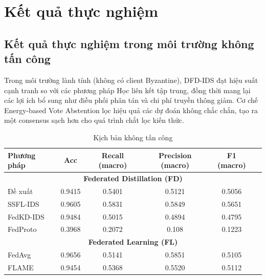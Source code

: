 \section{Kết quả thực nghiệm}
\label{sec:results}

\newcommand{\topone}[1]{\cellcolor{green!90!black}#1}
\newcommand{\toptwo}[1]{\cellcolor{green!60!black}#1}
\newcommand{\topthree}[1]{\cellcolor{green!30}#1}

\subsection{Kết quả thực nghiệm trong môi trường không tấn công}
Trong môi trường lành tính (không có client Byzantine), DFD-IDS đạt hiệu suất cạnh tranh so với các phương pháp Học liên kết tập trung, đồng thời mang lại các lợi ích bổ sung như điều phối phân tán và chi phí truyền thông giảm. Cơ chế Energy-based Vote Abstention lọc hiệu quả các dự đoán không chắc chắn, tạo ra một consensus sạch hơn cho quá trình chắt lọc kiến thức.

\begin{table}[H]
\centering
\small
\caption{Kịch bản không tấn công}
\label{tab:benign}
\begin{tabularx}{\textwidth}{lccccX}
\toprule
\textbf{Phương pháp} & \textbf{Acc} & \textbf{Recall (macro)} & \textbf{Precision (macro)} & \textbf{F1 (macro)} \\
\midrule
\multicolumn{6}{c}{\textbf{Federated Distillation (FD)}} \\
\midrule
Đề xuất           & 0.9415 & \toptwo{0.5401} & 0.5121 & 0.5056 \\
SSFL-IDS & \toptwo{0.9605} & \topone{0.5831} & \toptwo{0.5849} & \topone{0.5651}\\
FedKD-IDS  & 0.9484 & 0.5015 & 0.4894 & 0.4795 \\
FedProto  & 0.3968 & 0.2072 & 0.108 & 0.1223 \\
\midrule
\multicolumn{6}{c}{\textbf{Federated Learning (FL)}} \\
\midrule
FedAvg & \topone{0.9656} & 0.5141 & \topone{0.5851} & \topthree{0.5105} \\
FLAME  & 0.9454 & \topthree{0.5368} & \topthree{0.5520} & \toptwo{0.5112} \\
\bottomrule
\end{tabularx}
\end{table}

